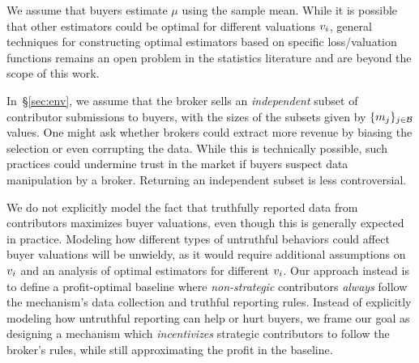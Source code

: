     We assume that buyers estimate $\mu$ using the sample mean. While it is possible that other estimators could be optimal for different valuations $v_{i}$, general techniques for constructing optimal estimators based on specific loss/valuation functions remains an open problem in the statistics literature and are beyond the scope of this work.

    
    In~\S\ref{sec:env}, we assume that the broker sells an \emph{independent} subset of contributor submissions to buyers, with the sizes of the subsets given by $\{m_j\}_{j\in\mathcal{B}}$ values. One might ask whether brokers could extract more revenue by biasing the selection or even corrupting the data. While this is technically possible, %
     such practices could undermine trust in the market if buyers suspect data manipulation by a broker. Returning an independent subset is less controversial.  

    We do not explicitly model the fact that truthfully reported data from contributors maximizes buyer valuations, even though this is generally expected in practice. Modeling how different types of untruthful behaviors could affect buyer valuations will be unwieldy, as it would require additional assumptions on $v_{i}$ and an analysis of optimal estimators for different $v_{i}$.
    Our approach instead is to define a profit-optimal baseline where 
    \emph{non-strategic} contributors \emph{always} follow the mechanism’s data collection and truthful reporting rules.
    Instead of explicitly modeling how untruthful reporting can help or hurt buyers, we frame our goal
    as designing a mechanism which \emph{incentivizes} strategic contributors to follow the broker's rules, while
    still  approximating the profit in the baseline.

